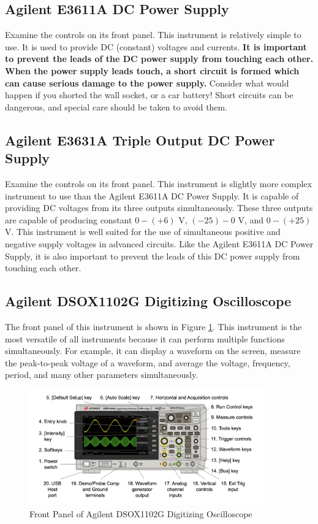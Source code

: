 \documentclass[12pt]{../manual}
\begin{document}
\subsection{Agilent E3611A DC Power Supply}
Examine the controls on its front panel. This instrument is relatively simple to use. It is used to provide DC (constant) voltages and currents. \textbf{It is important to prevent the leads of the DC power supply from touching each other. When the power supply leads touch, a short circuit is formed which can cause serious damage to the power supply.} Consider what would happen if you shorted the wall socket, or a car battery! Short circuits can be dangerous, and special care should be taken to avoid them.

\subsection{Agilent E3631A Triple Output DC Power Supply}
Examine the controls on its front panel. This instrument is slightly more complex instrument to use than the Agilent E3611A DC Power Supply. It is capable of providing DC voltages from its three outputs simultaneously. These three outputs are capable of producing constant $0 - (+6)$ V, $(-25) -0$ V, and $0 - (+25)$ V. This instrument is well suited for the use of simultaneous positive and negative supply voltages in advanced circuits. Like the Agilent E3611A DC Power Supply, it is also important to prevent the leads of this DC power supply from touching each other.

\subsection{Agilent DSOX1102G Digitizing Oscilloscope}
The front panel of this instrument is shown in Figure \ref{fig:oscfront}. This instrument is the most versatile of all instruments because it can perform multiple functions simultaneously. For example, it can display a waveform on the screen, measure the peak-to-peak voltage of a waveform, and average the voltage, frequency, period, and many other parameters simultaneously. 

\begin{figure}[ht!]
\begin{center}
\includegraphics[width=0.9\textwidth]{figures/OscFrontPanel.png}
\caption[Front Panel of Agilent DSOX1102G Digitizing Oscilloscope]{Front Panel of Agilent DSOX1102G Digitizing Oscilloscope}
\label{fig:oscfront}
\end{center}
\end{figure}
\end{document}
